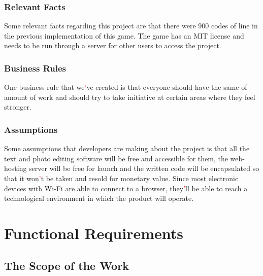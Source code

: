 \documentclass[11pt, oneside]{article}   	%
\begin{document}
\subsubsection{Relevant Facts}
Some relevant facts regarding this project are that there were 900 codes of line in the previous implementation of this game. The game has an MIT license and needs to be run through a server for other users to access the project.


\subsubsection{Business Rules}
One business rule that we\textcolor{red}{'}ve created is that everyone should have the same of amount of work and should try to take initiative at certain areas where they feel stronger.


\subsubsection{Assumptions}
Some assumptions that developers are making about the project is that all the text and photo editing software will be free and accessible for them, the web-hosting server will be free for launch and the written code will be encapsulated so that it won\textcolor{red}{'}t be taken and resold for monetary value. Since most electronic devices with Wi-Fi are able to connect to a browser, they\textcolor{red}{'}ll be able to reach a technological environment in which the product will operate.


\newpage
\section{Functional Requirements}
\subsection{The Scope of the Work}
\end{document}
